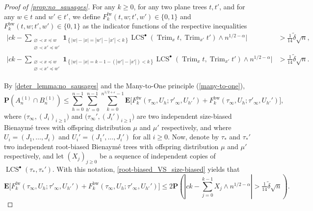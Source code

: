 \documentclass[11pt,reqno]{amsart}
\newcommand{\1}{\mathbf{1}}
\newcommand{\0}{\mathbf{0}}
\newcommand{\E}{{\mathbf E}}
\newcommand{\I}[1]{{\mathbf 1}_{\left\{#1\right\}}}
\newcommand{\prob}{\mathbf{P}}
\newcommand{\Trim}{\operatorname{Trim}}
\newcommand{\LCS}{\operatorname{LCS}}
\newcommand{\fw}{\mathrm{fw}}
\newcommand{\bw}{\mathrm{bw}}
\begin{document}
\begin{proof}[Proof of \cref{prop:no_sausages}]
    For any $k\geq 0$, for any two plane trees $t, t'$, and for any $w\in t$ and $w'\in t'$, we define $F_{k}^{\fw}(t,w;t',w')\in \{0,1\}$ and $F_k^{\bw}(t,w;t',w')\in\{0,1\}$ as the indicator functions of the respective inequalities
    \begin{align*}
    \Bigg|ck-\sum_{\substack{\varnothing \prec x\preceq w \\ \varnothing \prec x'\preceq w'}} \I{|w|-|x|=|w'|-|x'|<k} \LCS^\bullet\left(\Trim_{x} t,\Trim_{x'} t'\right)\wedge n^{1/2-\alpha}\Bigg|&>\tfrac{1}{14}\tilde\delta \sqrt{n},\\
    \Bigg|ck-\sum_{\substack{\varnothing \prec x\preceq w \\ \varnothing \prec x'\preceq w'}} \I{|w|-|x|=k-1-(|w'|-|x'|)<k} \LCS^\bullet\left(\Trim_{x} t,\Trim_{x'} t'\right)\wedge n^{1/2-\alpha}\Bigg|&>\tfrac{1}{14}\tilde\delta \sqrt{n}.
    \end{align*}
    
    By \cref{deter_lemma:no_sausages} and the Many-to-One principle (\cref{many-to-one}), 
    \begin{equation}\label{bound_B4}
    \prob(A_n^{(1)}\cap B^{(1)}_n)\le \sum_{h=0}^{n-1} \sum_{h'=0}^{n-1}\sum_{k=0}^{n^{1/2+\varepsilon}-1} \E\big[F_k^\fw(\tau_\infty,U_h; \tau'_\infty, U_{h'}')+F_k^\bw(\tau_\infty,U_h; \tau'_\infty, U_{h'}')\big],
    \end{equation}
    where $\big(\tau_\infty,(J_i)_{i\geq 1}\big)$ and $\big(\tau_\infty',(J_i')_{i\geq 1}\big)$ are two independent size-biased Bienaym\'{e} trees with offspring distribution $\mu$ and $\mu'$ respectively, and where $U_i = (J_1,\ldots,J_i)$ and $U_i' = (J_1',\ldots,J_i')$ for all $i\geq 0$. Now, denote by $\tau_{*}$ and $\tau_{*}'$ two independent root-biased Bienaym\'{e} trees with offspring distribution $\mu$ and $\mu'$ respectively, and let $(X_j)_{j\geq 0}$ be a sequence of independent copies of $\LCS^\bullet(\tau_*, \tau_*')$. With this notation, \cref{root-biased_VS_size-biased} yields that
    \[
        \E\big[F_k^\fw(\tau_\infty,U_h; \tau'_\infty, U_{h'}')+F_k^\bw(\tau_\infty,U_h; \tau'_\infty, U_{h'}')\big]\le 2 \prob\left(\left|ck-\sum_{j=0}^{k-1} X_j \wedge n^{1/2-\alpha}\right|>\tfrac{1}{14}\tilde\delta \sqrt{n} \right). 
    \]
    

\end{proof}
\end{document}
